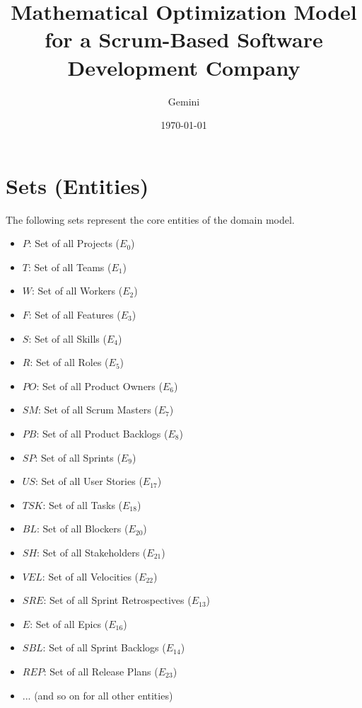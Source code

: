 \documentclass[11pt]{article}
\title{Mathematical Optimization Model for a Scrum-Based Software Development Company}
\author{Gemini}
\date{\today}
\begin{document}
\maketitle
\tableofcontents
\newpage

\section{Sets (Entities)}
The following sets represent the core entities of the domain model.
\begin{itemize}
    \item $P$: Set of all Projects ($E_0$)
    \item $T$: Set of all Teams ($E_1$)
    \item $W$: Set of all Workers ($E_2$)
    \item $F$: Set of all Features ($E_3$)
    \item $S$: Set of all Skills ($E_4$)
    \item $R$: Set of all Roles ($E_5$)
    \item $PO$: Set of all Product Owners ($E_6$)
    \item $SM$: Set of all Scrum Masters ($E_7$)
    \item $PB$: Set of all Product Backlogs ($E_8$)
    \item $SP$: Set of all Sprints ($E_9$)
    \item $US$: Set of all User Stories ($E_{17}$)
    \item $TSK$: Set of all Tasks ($E_{18}$)
    \item $BL$: Set of all Blockers ($E_{20}$)
    \item $SH$: Set of all Stakeholders ($E_{21}$)
    \item $VEL$: Set of all Velocities ($E_{22}$)
    \item $SRE$: Set of all Sprint Retrospectives ($E_{13}$)
    \item $E$: Set of all Epics ($E_{16}$)
    \item $SBL$: Set of all Sprint Backlogs ($E_{14}$)
    \item $REP$: Set of all Release Plans ($E_{23}$)
    \item ... (and so on for all other entities)
\end{itemize}
\end{document}
